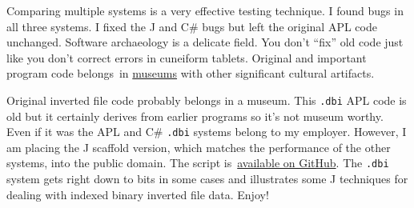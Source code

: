 Comparing multiple systems is a very effective testing technique. I
found bugs in all three systems. I fixed the J and C\# bugs but left the
original APL code unchanged. Software archaeology is a delicate field.
You don't ``fix'' old code just like you don't correct errors in
cuneiform tablets. Original and important program code belongs~in
\href{http://www.computerhistory.org/}{museums} with other significant
cultural artifacts.

Original inverted file code probably belongs in a museum. This
\texttt{.dbi} APL code is old but it certainly derives from earlier
programs so it's not museum worthy. Even if it was the APL and C\#
\texttt{.dbi} systems belong to my employer. However, I am placing the J
scaffold version, which matches the performance of the other systems,
into the public domain. The script
is~\href{https://github.com/bakerjd99/jacks/tree/master/dbi}{available
on GitHub}. The \texttt{.dbi} system gets right down to bits in some cases and
illustrates some J techniques for dealing with indexed binary inverted
file data. Enjoy!






